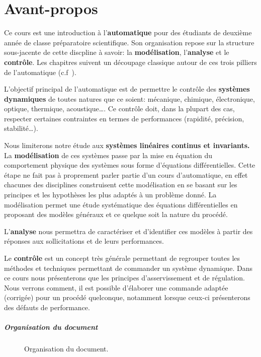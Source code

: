 \chapter*{Avant-propos}

Ce cours est une introduction à l'\textbf{automatique}
pour des étudiants de deuxième année de classe préparatoire scientifique.
Son organisation repose sur la structure sous-jacente de cette discpline à savoir: 
la \textbf{modélisation}, l'\textbf{analyse} et 
le \textbf{contrôle}. Les chapitres suivent un découpage classique
autour de ces trois pilliers de l'automatique (c.f~).

L'objectif principal de l'automatique est de permettre
le contrôle des \textbf{systèmes dynamiques}
de toutes natures que ce soient: mécanique, chimique, 
électronique, optique, thermique, acoustique\ldots.
Ce contrôle doit, dans la plupart des cas, respecter
certaines contraintes en termes de performances (rapidité, précision, stabilité\ldots). 

Nous limiterons notre étude aux \textbf{systèmes linéaires continus et invariants.}
La \textbf{modélisation} de ces systèmes passe par 
la mise en équation du comportement physique des
systèmes sous forme d'équations différentielles.
Cette étape ne fait pas à proprement parler partie d'un cours d'automatique,
en effet chacunes des disciplines construisent cette modélisation 
en se basant sur les principes et les hypothèses les plus adaptés 
à un problème donné.
La modélisation permet une étude systématique des équations
différentielles en proposant des modèles généraux 
et ce quelque soit la nature du procédé.

L'\textbf{analyse} nous permettra de caractériser et d'identifier 
ces modèles à partir des réponses aux sollicitations et de leurs performances.

Le \textbf{contrôle} est un concept très générale permettant de regrouper
toutes les méthodes et techniques permettant de commander un système dynamique.
Dans ce cours nous présenterons que les principes d'asservissement et de régulation.
Nous verrons comment, il est possible d'élaborer une commande adaptée (corrigée) 
pour un procédé quelconque, notamment lorsque ceux-ci présenterons des défauts de performance.


\paragraph{Organisation du document}

\begin{figure}[!h]
\renewcommand\thefigure{A}
\begin{center}
{
\tikzset{external/export=false}

}
\end{center}
\caption{Organisation du document.\label{fig-diagramme_cours}}
\end{figure}
